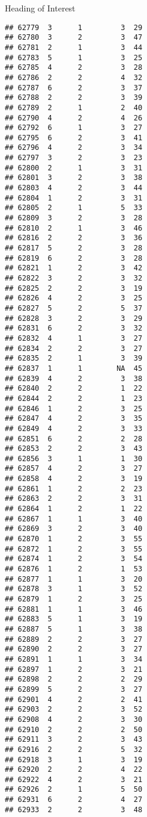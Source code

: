 \documentclass[
  ignorenonframetext,
]{beamer}
\begin{document}
\begin{frame}[fragile]{Heading of Interest}
\begin{verbatim}
## 62779  3      1         3  29
## 62780  3      2         3  47
## 62781  2      1         3  44
## 62783  5      1         3  25
## 62785  4      2         3  28
## 62786  2      2         4  32
## 62787  6      2         3  37
## 62788  2      2         3  39
## 62789  2      1         2  40
## 62790  4      2         4  26
## 62792  6      1         3  27
## 62795  6      2         3  41
## 62796  4      2         3  34
## 62797  3      2         3  23
## 62800  2      1         3  31
## 62801  3      2         3  38
## 62803  4      2         3  44
## 62804  1      2         3  31
## 62805  2      1         5  33
## 62809  3      2         3  28
## 62810  2      1         3  46
## 62816  2      2         3  36
## 62817  5      2         3  28
## 62819  6      2         3  28
## 62821  1      2         3  42
## 62822  3      2         3  32
## 62825  2      2         3  19
## 62826  4      2         3  25
## 62827  5      2         5  37
## 62828  3      2         3  29
## 62831  6      2         3  32
## 62832  4      1         3  27
## 62834  2      2         3  27
## 62835  2      1         3  39
## 62837  1      1        NA  45
## 62839  4      2         3  38
## 62840  2      2         1  22
## 62844  2      2         1  23
## 62846  1      2         3  25
## 62847  4      2         3  35
## 62849  4      2         3  33
## 62851  6      2         2  28
## 62853  2      2         3  43
## 62856  3      1         1  30
## 62857  4      2         3  27
## 62858  4      2         3  19
## 62861  1      2         2  23
## 62863  2      2         3  31
## 62864  1      2         1  22
## 62867  1      1         3  40
## 62869  3      2         3  40
## 62870  1      2         3  55
## 62872  1      2         3  55
## 62874  1      2         3  54
## 62876  1      2         1  53
## 62877  1      1         3  20
## 62878  3      1         3  52
## 62879  1      2         3  25
## 62881  1      1         3  46
## 62883  5      1         3  19
## 62887  5      1         3  38
## 62889  2      2         3  27
## 62890  2      2         3  27
## 62891  1      1         3  34
## 62897  1      2         3  21
## 62898  2      2         2  29
## 62899  5      2         3  27
## 62901  4      2         2  41
## 62903  2      2         3  52
## 62908  4      2         3  30
## 62910  2      2         2  50
## 62911  3      2         3  43
## 62916  2      2         5  32
## 62918  3      1         3  19
## 62920  2      2         4  22
## 62922  4      2         3  21
## 62926  2      1         5  50
## 62931  6      2         4  27
## 62933  2      2         3  48

\end{verbatim}
\end{frame}
\end{document}
